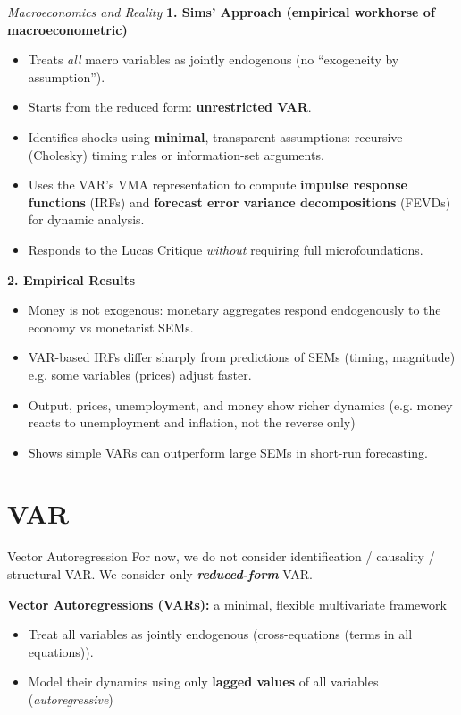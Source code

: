 \documentclass{beamer}
\begin{document}
\begin{frame}{\textit{Macroeconomics and Reality }}
\footnotesize
\textbf{1. Sims’ Approach (empirical workhorse of macroeconometric)}
\begin{itemize}
    \item Treats \emph{all} macro variables as jointly endogenous (no “exogeneity by assumption”).
    \item Starts from the reduced form: \textbf{unrestricted VAR}.
    \item Identifies shocks using \textbf{minimal}, transparent assumptions: recursive (Cholesky) timing rules or information-set arguments.
    \item Uses the VAR’s VMA representation to compute \textbf{impulse response functions} (IRFs) and
          \textbf{forecast error variance decompositions} (FEVDs) for dynamic analysis.
          \item Responds to the Lucas Critique \emph{without} requiring full microfoundations.
\end{itemize}

\bigskip

\textbf{2. Empirical Results}
\begin{itemize}
    \item Money is not exogenous: monetary aggregates respond endogenously to the economy vs monetarist SEMs.
    \item VAR-based IRFs differ sharply from predictions of SEMs (timing, magnitude) e.g. some variables (prices) adjust faster.
    \item Output, prices, unemployment, and money show richer dynamics (e.g. money reacts to unemployment and inflation, not the reverse only)
    \item Shows simple VARs can outperform large SEMs in short-run forecasting.
\end{itemize}

\end{frame}



\section{VAR}


\begin{frame}{Vector Autoregression}
For now, we do not consider identification / causality / structural VAR. We consider only \textbf{\textit{reduced-form}} VAR.
\bigskip

\textbf{Vector Autoregressions (VARs):} a minimal, flexible multivariate framework
\begin{itemize}
    \item Treat all variables as jointly endogenous (cross-equations (terms in all equations)).
    \item Model their dynamics using only \textbf{lagged values} of all variables (\textit{autoregressive})
\end{itemize}
\end{frame}
\end{document}
